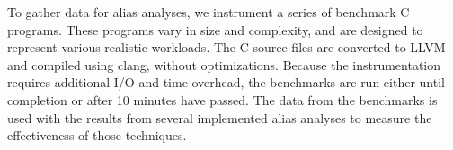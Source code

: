 To gather data for alias analyses, we instrument a series of benchmark C programs. These programs vary in size and complexity, and are designed to represent various realistic workloads. The C source files are converted to LLVM and compiled using clang, without optimizations. Because the instrumentation requires additional I/O and time overhead, the benchmarks are run either until completion or after 10 minutes have passed. The data from the benchmarks is used with the results from several implemented alias analyses to measure the effectiveness of those techniques.
